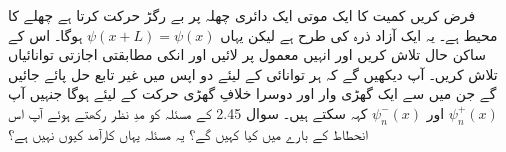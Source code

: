 \documentclass[leqno, b5paper]{khalid-urdu-book}
\begin{document}
فرض کریں کمیت  کا ایک موتی ایک دائری چھلہ پر بے رگڑ حرکت کرتا ہے چھلے کا محیط  ہے۔ یہ ایک آزاد ذرہ کی طرح ہے لیکن یہاں \(\psi(x+L) = \psi(x)\) ہوگا۔ اس کے ساکن حال تلاش کریں اور انہیں معمول پر لائیں اور انکی مطابقتی اجازتی توانائیاں تلاش کریں۔ آپ دیکھیں گے کہ ہر توانائی  کے لیئے دو اپس میں غیر تابع حل پائے جائیں گے جن میں سے ایک گھڑی وار اور دوسرا خلافِ گھڑی حرکت کے لیئے ہوگا جنہیں آپ \(\psi_n^+(x)\) اور \(\psi_n^-(x)\) کہہ سکتے ہیں۔ سوال \num{2.45} کے مسئلہ کو مدِ نظر رکھتے ہوئے آپ اس انحطاط کے بارے میں کیا کہیں گے؟ یہ مسئلہ یہاں کارآمد کیوں نہیں ہے؟
\end{document}
